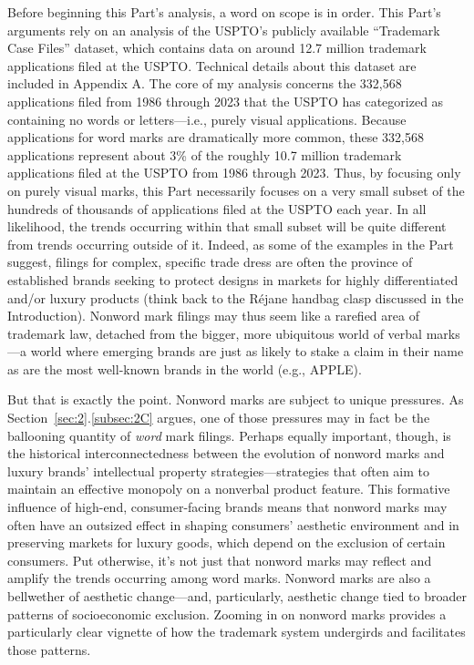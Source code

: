 \documentclass[letterpaper, 11pt, oneside]{article}
\begin{document}
Before beginning this Part's analysis, a word on scope is in order. This Part's arguments rely on an analysis of the USPTO's publicly available ``Trademark Case Files'' dataset, which contains data on around 12.7 million trademark applications filed at the USPTO. Technical details about this dataset are included in Appendix A. The core of my analysis concerns the 332,568 applications filed from 1986 through 2023 that the USPTO has categorized as containing no words or letters—i.e., purely visual applications. Because applications for word marks are dramatically more common, these 332,568 applications represent about 3\% of the roughly 10.7 million trademark applications filed at the USPTO from 1986 through 2023. Thus, by focusing only on purely visual marks, this Part necessarily focuses on a very small subset of the hundreds of thousands of applications filed at the USPTO each year. In all likelihood, the trends occurring within that small subset will be quite different from trends occurring outside of it. Indeed, as some of the examples in the Part suggest, filings for complex, specific trade dress are often the province of established brands seeking to protect designs in markets for highly differentiated and/or luxury products (think back to the Réjane handbag clasp discussed in the Introduction). Nonword mark filings may thus seem like a rarefied area of trademark law, detached from the bigger, more ubiquitous world of verbal marks—a world where emerging brands are just as likely to stake a claim in their name as are the most well-known brands in the world (e.g., APPLE).

But that is exactly the point. Nonword marks are subject to unique pressures. As Section~\ref{sec:2}.\ref{subsec:2C} argues, one of those pressures may in fact be the ballooning quantity of \textit{word} mark filings. Perhaps equally important, though, is the historical interconnectedness between the evolution of nonword marks and luxury brands' intellectual property strategies—strategies that often aim to maintain an effective monopoly on a nonverbal product feature. This formative influence of high-end, consumer-facing brands means that nonword marks may often have an outsized effect in shaping consumers' aesthetic environment and in preserving markets for luxury goods, which depend on the exclusion of certain consumers. Put otherwise, it's not just that nonword marks may reflect and amplify the trends occurring among word marks. Nonword marks are also a bellwether of aesthetic change—and, particularly, aesthetic change tied to broader patterns of socioeconomic exclusion. Zooming in on nonword marks provides a particularly clear vignette of how the trademark system undergirds and facilitates those patterns.
\end{document}
